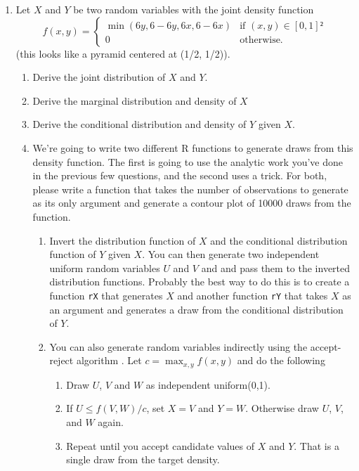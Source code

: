 \begin{enumerate}
\item Let $X$ and $Y$ be two random variables with the joint density
  function
  \begin{equation}\label{eq:prob_1}
    f(x, y) = \begin{cases}
      \min(6 y, 6 - 6y, 6 x, 6 - 6 x) & \text{if } (x, y) ∈ [0,1]² \\
      0 & \text{otherwise.}
    \end{cases}
  \end{equation}
  (this looks like a pyramid centered at (1/2, 1/2)).
  \begin{enumerate}
  \item Derive the joint distribution of $X$ and $Y$.
  \item Derive the marginal distribution and density of $X$
  \item Derive the conditional distribution and density of $Y$ given
    $X$.
  \item We're going to write two different R functions to generate
    draws from this density function. The first is going to use the
    analytic work you've done in the previous few questions, and the
    second uses a trick. For both, please write a function that takes
    the number of observations to generate as its only argument and
    generate a contour plot of 10000 draws from the function.
    \begin{enumerate}
    \item Invert the distribution function of $X$ and the conditional
      distribution function of $Y$ given $X$. You can then generate
      two independent uniform random variables $U$ and $V$ and and
      pass them to the inverted distribution functions. Probably the
      best way to do this is to create a function \texttt{rX} that
      generates $X$ and another function \texttt{rY} that takes $X$ as
      an argument and generates a draw from the conditional
      distribution of $Y$.
    \item You can also generate random variables indirectly using the
      accept-reject algorithm \citep[Section 5.6.2]{CB02}. Let $c =
      \max_{x,y} f(x,y)$ and do the following
      \begin{enumerate}
      \item Draw $U$, $V$ and $W$ as independent uniform(0,1).
      \item If $U ≤ f(V,W) / c$, set $X=V$ and $Y=W$.  Otherwise draw
        $U$, $V$, and $W$ again.
      \item Repeat until you accept candidate values of $X$ and
        $Y$. That is a single draw from the target density.
      \end{enumerate}
    \end{enumerate}


\end{enumerate}
\end{enumerate}
